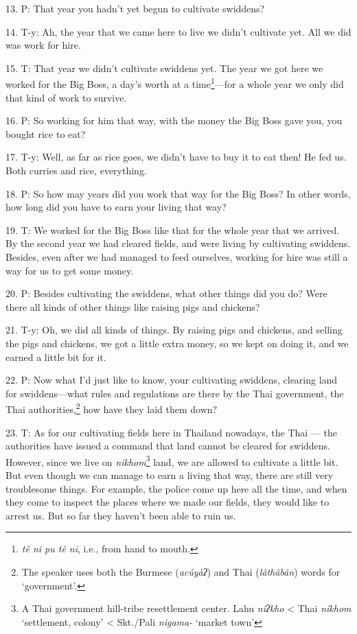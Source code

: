 13. P: That year you hadn't yet begun to cultivate swiddens?

14. T-y: Ah, the year that we came here to live we didn't cultivate yet. All we
did was work for hire.

15. T: That year we didn't cultivate swiddens yet. The year we got here we worked
for the Big Boss, a day's worth at a time\footnote{\textit{tê ni pu tê ni}, i.e., from hand to mouth.}---for a whole year we only did that
kind of work to survive.

16. P: So working for him that way, with the money the Big Boss gave you, you bought
rice to eat?

17. T-y: Well, as far as rice goes, we didn't have to buy it to eat then! He fed
us. Both curries and rice, everything.

18. P: So how may years did you work that way for the Big Boss? In other words,
how long did you have to earn your living that way?

19. T: We worked for the Big Boss like that for the whole year that we arrived.
By the second year we had cleared fields, and were living by cultivating swiddens.
Besides, even after we had managed to feed ourselves, working for hire was still
a way for us to get some money.

20. P: Besides cultivating the swiddens, what other things did you do? Were there
all kinds of other things like raising pigs and chickens?

21. T-y: Oh, we did all kinds of things. By raising pigs and chickens, and selling
the pigs and chickens, we got a little extra money, so we kept on doing it, and
we earned a little bit for it.

22. P: Now what I'd just like to know, your cultivating swiddens, clearing land
for swiddens---what rules and regulations are there by the Thai government, the
Thai authorities,\footnote{The speaker uses both the Burmese (\textit{acúyàʔ}) and Thai (\textit{lâthâbân}) words for `government'.} how have they laid them down?

23. T: As for our cultivating fields here in Thailand nowadays, the Thai --- the
authorities have issued a command that land cannot be cleared for swiddens. However,
since we live on \textit{nikhom}\footnote{A Thai government hill-tribe resettlement center. Lahu \textit{nîʔkho} < Thai \textit{níkhom} `settlement, colony' < Skt./Pali \textit{nigama-} `market town'} land, we are allowed to cultivate a little
bit. But even though we can manage to earn a living that way, there are still very
troublesome things. For example, the police come up here all the time, and when
they come to inspect the places where we made our fields, they would like to arrest
us. But so far they haven't been able to ruin us.

